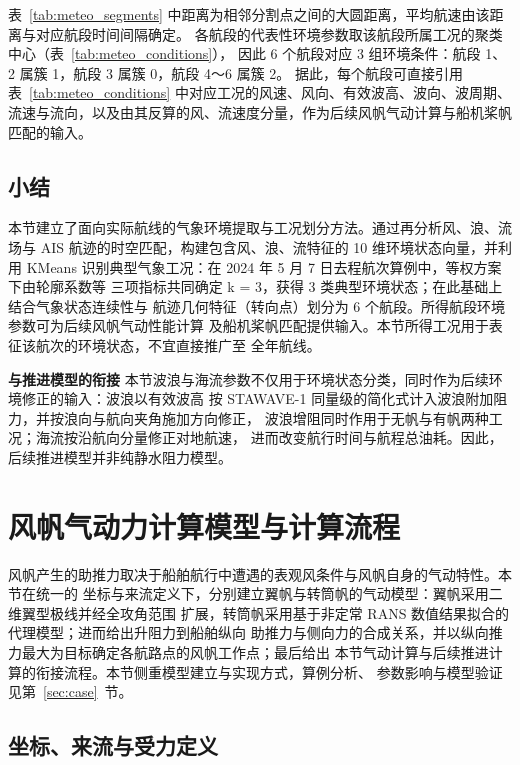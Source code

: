 \documentclass[UTF8,a4paper,twoside,zihao=5,fontset=windows]{ctexart}
\begin{document}
表~\ref{tab:meteo_segments} 中距离为相邻分割点之间的大圆距离，平均航速由该距离与对应航段时间间隔确定。
各航段的代表性环境参数取该航段所属工况的聚类中心（表~\ref{tab:meteo_conditions}），
因此 6 个航段对应 3 组环境条件：航段 1、2 属簇 1，航段 3 属簇 0，航段 4～6 属簇 2。
据此，每个航段可直接引用表~\ref{tab:meteo_conditions} 中对应工况的风速、风向、有效波高、波向、波周期、
流速与流向，以及由其反算的风、流速度分量，作为后续风帆气动计算与船机桨帆匹配的输入。

\subsection{小结}

本节建立了面向实际航线的气象环境提取与工况划分方法。通过再分析风、浪、流场与
AIS 航迹的时空匹配，构建包含风、浪、流特征的 10 维环境状态向量，并利用 KMeans
识别典型气象工况：在 2024 年 5 月 7 日去程航次算例中，等权方案下由轮廓系数等
三项指标共同确定 k = 3，获得 3 类典型环境状态；在此基础上结合气象状态连续性与
航迹几何特征（转向点）划分为 6 个航段。所得航段环境参数可为后续风帆气动性能计算
及船机桨帆匹配提供输入。本节所得工况用于表征该航次的环境状态，不宜直接推广至
全年航线。

\par\noindent\textbf{与推进模型的衔接}
本节波浪与海流参数不仅用于环境状态分类，同时作为后续环境修正的输入：波浪以有效波高
按 STAWAVE-1 同量级的简化式计入波浪附加阻力，并按浪向与航向夹角施加方向修正，
波浪增阻同时作用于无帆与有帆两种工况；海流按沿航向分量修正对地航速，
进而改变航行时间与航程总油耗。因此，后续推进模型并非纯静水阻力模型。

\section{风帆气动力计算模型与计算流程}
\label{sec:aero}
\label{sec:sail_aero}

风帆产生的助推力取决于船舶航行中遭遇的表观风条件与风帆自身的气动特性。本节在统一的
坐标与来流定义下，分别建立翼帆与转筒帆的气动模型：翼帆采用二维翼型极线并经全攻角范围
扩展，转筒帆采用基于非定常 RANS 数值结果拟合的代理模型；进而给出升阻力到船舶纵向
助推力与侧向力的合成关系，并以纵向推力最大为目标确定各航路点的风帆工作点；最后给出
本节气动计算与后续推进计算的衔接流程。本节侧重模型建立与实现方式，算例分析、
参数影响与模型验证见第~\ref{sec:case}~节。

\subsection{坐标、来流与受力定义}
\end{document}
